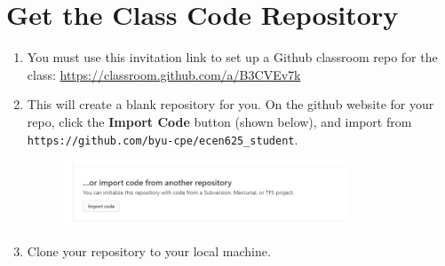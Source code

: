 \section{Get the Class Code Repository}
\begin{enumerate}
	\item You must use this invitation link to set up a Github classroom repo for the class: \url{https://classroom.github.com/a/B3CVEv7k}
	\item This will create a blank repository for you.  On the github website for your repo, click the \textbf{Import Code} button (shown below), and import from \texttt{https://github.com/byu-cpe/ecen625\_student}.
	\begin{figure}[h!]
		\centering
		\includegraphics[width=0.8\textwidth]{import_code.png}
	\end{figure}
	\item Clone your repository to your local machine.  
\end{enumerate}

